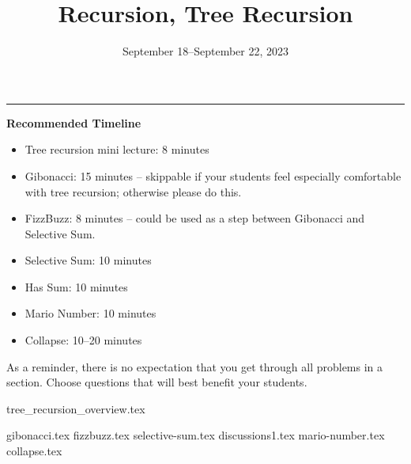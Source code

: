\documentclass{exam}
\title{Recursion, Tree Recursion}
\date{September 18--September 22, 2023}
\begin{document}
\maketitle
\rule{\textwidth}{0.15em}
\fontsize{12}{15}\selectfont

\begin{meta}
\textbf{Recommended Timeline}
\begin{itemize}
    \item Tree recursion mini lecture: 8 minutes
    \item Gibonacci: 15 minutes -- skippable if your students feel especially comfortable with tree recursion; otherwise please do this.
    \item FizzBuzz: 8 minutes -- could be used as a step between Gibonacci and Selective Sum.
    \item Selective Sum: 10 minutes
    \item Has Sum: 10 minutes
    \item Mario Number: 10 minutes
    \item Collapse: 10--20 minutes
\end{itemize}
As a reminder, there is no expectation that you get through all problems in a section. Choose questions that will best benefit your students.
\end{meta}

{tree_recursion_overview.tex}
\begin{questions}
    {gibonacci.tex}
    {fizzbuzz.tex}
    {selective-sum.tex}
    {discussions1.tex} 
    {mario-number.tex}
    {collapse.tex}
\end{questions}
\end{document}

